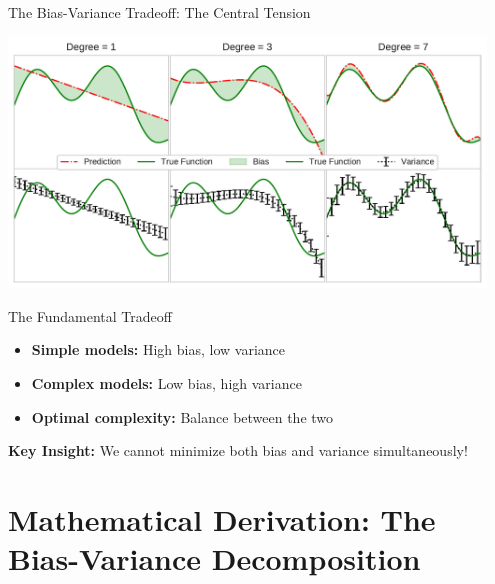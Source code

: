 \documentclass[10pt]{beamer}
\newcommand{\fitpic}[1]{\begin{adjustbox}{max width=\linewidth, max totalheight=0.78\textheight}#1\end{adjustbox}}
\begin{document}
\begin{frame}{The Bias-Variance Tradeoff: The Central Tension}
\begin{center}
\fitpic{\includegraphics[width=0.95\textwidth]{../assets/bias-variance/figures/bv-2.pdf}}
\end{center}

\begin{alertbox}{The Fundamental Tradeoff}
\begin{itemize}
\item \textbf{Simple models:} High bias, low variance
\item \textbf{Complex models:} Low bias, high variance
\item \textbf{Optimal complexity:} Balance between the two
\end{itemize}
\end{alertbox}

\begin{keypointsbox}
\textbf{Key Insight:} We cannot minimize both bias and variance simultaneously!
\end{keypointsbox}
\end{frame}

\section{Mathematical Derivation: The Bias-Variance Decomposition}
\end{document}
